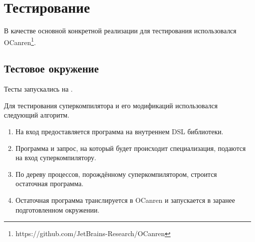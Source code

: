 \section{Тестирование}
\label{sec:testing}

В качестве основной конкретной реализации \ukanren для тестирования
использовался OCanren\footnote{https://github.com/JetBrains-Research/OCanren}\cite{ocanren}.

\subsection{Тестовое окружение}

Тесты запускались на .

Для тестирования суперкомпилятора и его модификаций использовался следующий алгоритм.
\begin{enumerate}
\item На вход предоставляется программа на внутреннем DSL \ukanren библиотеки.
\item Программа и запрос, на который будет происходит специализация, подаются на вход суперкомпилятору.
\item По дереву процессов, порождённому суперкомпилятором, строится остаточная программа.
\item Остаточная программа транслируется в OCanren и запускается в заранее подготовленном окружении.
\end{enumerate}

